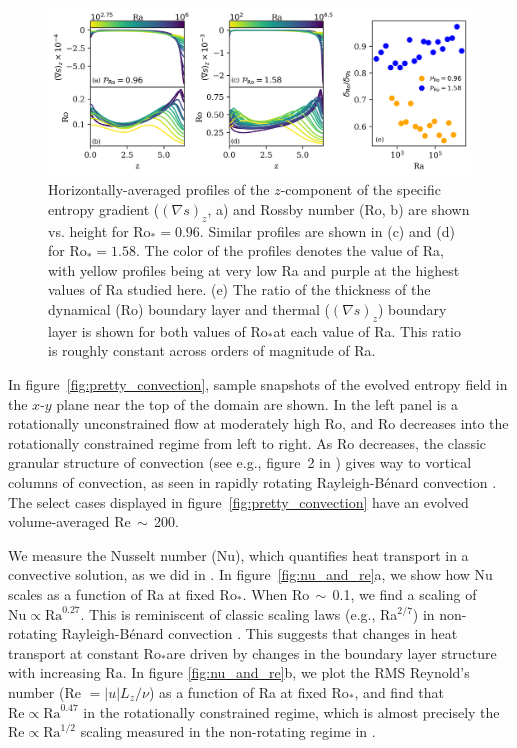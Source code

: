 \documentclass[twocolumn, amsmath, amsfonts, amssymb]{aastex62}
\newcommand{\grad}{\ensuremath{\nabla}}
\newcommand{\RB}{Rayleigh-B\'{e}nard }
\newcommand{\pro}{\ensuremath{\text{Ro}_{\text{*}}}}
\begin{document}
\begin{figure}[ht!]
    \includegraphics[width=\textwidth]{./figs/boundary_layers.png}
    \caption{Horizontally-averaged profiles of the $z$-component of 
    the specific entropy gradient ($(\grad s)_z$, a) and Rossby number (Ro, b) 
    are shown vs. height for $\pro = 0.96$. 
    Similar profiles are shown in (c) and (d) for $\pro = 1.58$. The color of the profiles
    denotes the value of Ra, with yellow profiles being at very low Ra and purple at the highest
    values of Ra studied here.
    (e) The ratio of the thickness of the dynamical (Ro) boundary layer and 
    thermal ($(\grad s)_z$) boundary layer is shown for both values of \pro at each value of Ra.
    This ratio is roughly constant across orders of magnitude of Ra.
    \label{fig:profiles_and_bls} }
\end{figure}

In figure~\ref{fig:pretty_convection}, sample snapshots
of the evolved entropy field in the $x$-$y$ plane near the top of the domain are shown. 
In the left panel is a rotationally unconstrained flow at moderately high
Ro, and Ro decreases into the rotationally constrained regime from left to right.
As Ro decreases, the
classic granular structure of convection (see e.g., figure~2 in \AB) gives way to vortical
columns of convection, as seen in rapidly rotating \RB convection \citep{stellmach&all2014}.
The select cases displayed in figure~\ref{fig:pretty_convection} have an evolved volume-averaged
Re$\,\sim\,$200.

We measure the Nusselt number (Nu), which quantifies heat transport in a convective
solution, as we did in \AB.
In figure~\ref{fig:nu_and_re}a, we show how Nu scales as a function
of Ra at fixed \pro. When Ro$\,\sim\,$0.1,
we find a scaling of $\text{Nu} \propto \text{Ra}^{0.27}$. This is reminiscent of
classic scaling laws (e.g., Ra$^{2/7}$) in non-rotating \RB convection \citep{ahlers&all2009}.
This suggests that changes in heat transport at constant \pro are driven by
changes in the boundary layer structure with increasing Ra.
In figure \ref{fig:nu_and_re}b, we plot the RMS Reynold's
number (Re $= |u| L_z / \nu$) as a function of Ra at fixed \pro, and find that 
$\text{Re} \propto \text{Ra}^{0.47}$ in the rotationally constrained regime,
which is almost precisely the $\text{Re} \propto \text{Ra}^{1/2}$ scaling measured
in the non-rotating regime in \AB.
\end{document}
